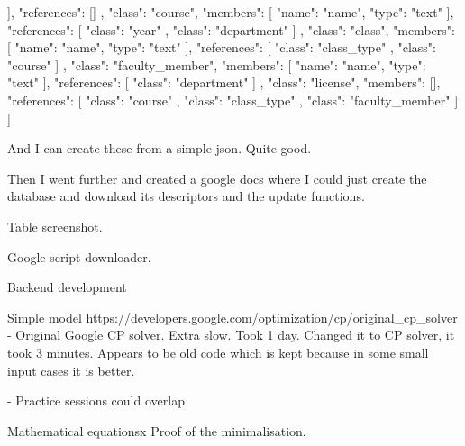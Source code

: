 {{{                }
            ],
            "references": []
        },
        {
            "class": "course",
            "members": [
                {
                    "name": "name",
                    "type": "text"
                }
            ],
            "references": [
                {
                    "class": "year"
                },
                {
                    "class": "department"
                }
            ]
        },
        {
            "class": "class",
            "members": [
                {
                    "name": "name",
                    "type": "text"
                }
            ],
            "references": [
                {
                    "class": "class\_type"
                },
                {
                    "class": "course"
                }
            ]
        },
        {
            "class": "faculty\_member",
            "members": [
                {
                    "name": "name",
                    "type": "text"
                }
            ],
            "references": [
                {
                    "class": "department"
                }
            ]
        },
        {
            "class": "license",
            "members": [],
            "references": [
                {
                    "class": "course"
                },
                {
                    "class": "class\_type"
                },
                {
                    "class": "faculty\_member"
                }
            ]
        }
    ]
}

And I can create these from a simple json. Quite good.

Then I went further and created a google docs where I could just create the database and download its descriptors and the update functions.

Table screenshot.

Google script downloader.




Backend development

Simple model
https://developers.google.com/optimization/cp/original\_cp\_solver
- Original Google CP solver. Extra slow. Took 1 day. Changed it to CP solver, it took 3 minutes. Appears to be old code which is kept because in some small input cases it is better.


- Practice sessions could overlap

Mathematical equationsx
Proof of the minimalisation.

